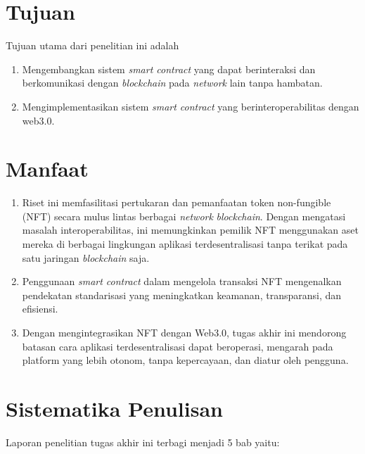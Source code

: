 \section{Tujuan}
\label{sec:Tujuan}

Tujuan utama dari penelitian ini adalah 

\begin{enumerate}[nolistsep]

  \item Mengembangkan sistem \emph{smart contract} yang dapat berinteraksi dan berkomunikasi dengan \emph{blockchain} pada \emph{network} lain tanpa hambatan.

  \item Mengimplementasikan sistem \emph{smart contract} yang berinteroperabilitas dengan web3.0.

\end{enumerate}

\section{Manfaat}
\label{sec:manfaat}

\begin{enumerate}[nolistsep]

  \item Riset ini memfasilitasi pertukaran dan pemanfaatan token non-fungible (NFT) secara mulus lintas berbagai \emph{network} \emph{blockchain}. Dengan mengatasi masalah interoperabilitas, ini memungkinkan pemilik NFT menggunakan aset mereka di berbagai lingkungan aplikasi terdesentralisasi tanpa terikat pada satu jaringan \emph{blockchain} saja.

  \item Penggunaan \emph{smart contract} dalam mengelola transaksi NFT mengenalkan pendekatan standarisasi yang meningkatkan keamanan, transparansi, dan efisiensi. 

  \item Dengan mengintegrasikan NFT dengan Web3.0, tugas akhir ini mendorong batasan cara aplikasi terdesentralisasi dapat beroperasi, mengarah pada platform yang lebih otonom, tanpa kepercayaan, dan diatur oleh pengguna.

\end{enumerate}

\section*{Sistematika Penulisan}
Laporan penelitian tugas akhir ini terbagi menjadi 5 bab yaitu:

